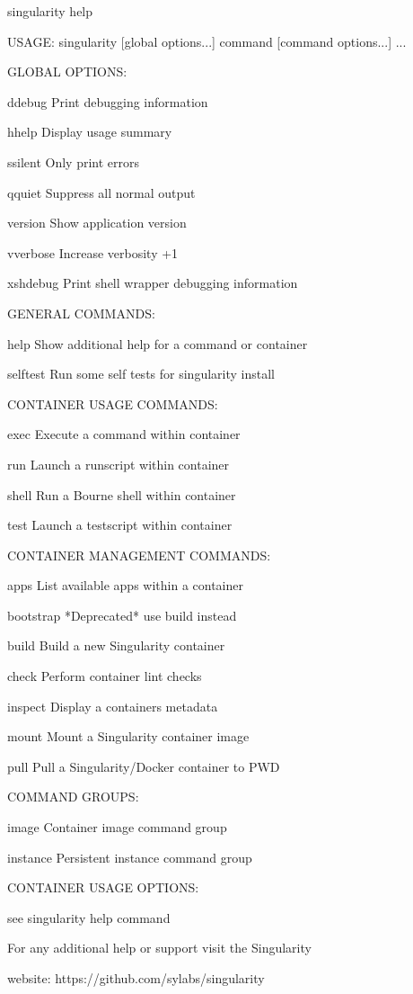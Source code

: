 \documentclass[letterpaper,10pt,english]{sphinxmanual}
\begin{document}
%
\begin{sphinxVerbatim}[commandchars=\\\{\}]
\PYGZdl{} singularity \PYGZhy{}\PYGZhy{}help

USAGE: singularity [global options...] \PYGZlt{}command\PYGZgt{} [command options...] ...


GLOBAL OPTIONS:

    \PYGZhy{}d\textbar{}\PYGZhy{}\PYGZhy{}debug    Print debugging information

    \PYGZhy{}h\textbar{}\PYGZhy{}\PYGZhy{}help     Display usage summary

    \PYGZhy{}s\textbar{}\PYGZhy{}\PYGZhy{}silent   Only print errors

    \PYGZhy{}q\textbar{}\PYGZhy{}\PYGZhy{}quiet    Suppress all normal output

       \PYGZhy{}\PYGZhy{}version  Show application version

    \PYGZhy{}v\textbar{}\PYGZhy{}\PYGZhy{}verbose  Increase verbosity +1

    \PYGZhy{}x\textbar{}\PYGZhy{}\PYGZhy{}sh\PYGZhy{}debug Print shell wrapper debugging information


GENERAL COMMANDS:

    help       Show additional help for a command or container

    selftest   Run some self tests for singularity install


CONTAINER USAGE COMMANDS:

    exec       Execute a command within container

    run        Launch a runscript within container

    shell      Run a Bourne shell within container

    test       Launch a testscript within container


CONTAINER MANAGEMENT COMMANDS:

    apps       List available apps within a container

    bootstrap  *Deprecated* use build instead

    build      Build a new Singularity container

    check      Perform container lint checks

    inspect    Display a container\PYGZsq{}s metadata

    mount      Mount a Singularity container image

    pull       Pull a Singularity/Docker container to \PYGZdl{}PWD


COMMAND GROUPS:

    image      Container image command group

    instance   Persistent instance command group


CONTAINER USAGE OPTIONS:

    see singularity help \PYGZlt{}command\PYGZgt{}

For any additional help or support visit the Singularity

website: https://github.com/sylabs/singularity
\end{sphinxVerbatim}
\end{document}
